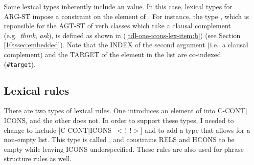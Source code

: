 \noindent Some lexical types inherently include an 
value. In this case, lexical types for ARG-ST
impose a constraint on the element of .  For instance,
the type , which is reponsible
for the AGT-ST of verb classes which take a clausal complement
(e.g.\ \textit{think}, \textit{ask}), is defined as shown in
(\ref{tdl-one-icons-lex-item:b}) (see Section \ref{10:ssec:embedded}).  Note
that the INDEX of the second argument (i.e.\ a clausal complement) and
the TARGET of the element in the  list are co-indexed
(\texttt{\#target}).











\subsection{Lexical rules}
\label{11:ssec:lr}

There are two types of lexical rules. One introduces an element of
 into C-CONT{$\mid$}ICONS, and the
other does not.  In order to support these types, I needed to change
 to include \mbox{[C-CONT{$\mid$}ICONS
    \ensuremath{<}!  !\ensuremath{>}]} and to add a type that allows
for a non-empty  list. This type is called
, and constrains RELS and HCONS to be empty
while leaving ICONS underspecified. These rules
are also used for phrase structure rules as well.


